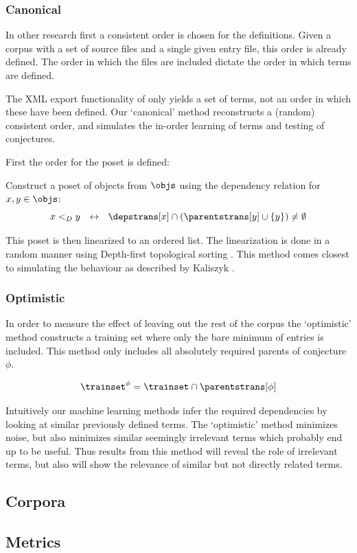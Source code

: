 \subsubsection{Canonical}
In other research first a consistent order is chosen for the definitions.
Given a corpus with a set of source files and a single given entry file, this order is already defined.
The order in which the files are included dictate the order in which terms are defined.

The XML export functionality of \coq only yields a set of terms, not an order in which these have been defined.
Our `canonical' method reconstructs a (random) consistent order, and simulates the in-order learning of terms and testing of conjectures.

First the order for the poset is defined:
\begin{definition}
  Construct a poset of objects from $\objs$ using the dependency relation for $x, y \in \objs$:
  \[
    x <_D y ~~\leftrightarrow~~ \depstrans[x] \cap (\parentstrans[y] \cup \{y\}) \neq \emptyset
  \]
\end{definition}

This poset is then linearized to an ordered list.
The linearization is done in a random manner using Depth-first topological sorting \cite{tarjan1976edge}.
This method comes closest to simulating the behaviour as described by Kaliszyk \cite{kaliszyk2014machine}.

\subsubsection{Optimistic}

In order to measure the effect of leaving out the rest of the corpus
the `optimistic' method constructs a training set where only the bare minimum of entries is included.
This method only includes all absolutely required parents of conjecture $\phi$.

\begin{definition}
  \[
    \trainset^{\phi} = \trainset \cap \parentstrans[\phi]
  \]
\end{definition}

Intuitively our machine learning methods infer the required dependencies by looking at similar previously defined terms.
The `optimistic' method minimizes noise, but also minimizes similar seemingly irrelevant terms which probably end up to be useful.
Thus results from this method will reveal the role of irrelevant terms, but also will show the relevance of similar but not directly related terms.

\subsection{Corpora}
\label{section:corpora}


\subsection{Metrics}
\label{section:metrics}

